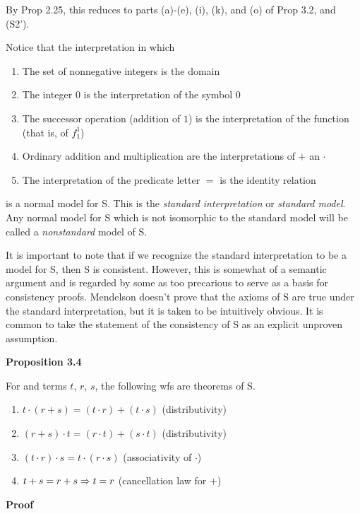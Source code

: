 By Prop 2.25, this reduces to parts (a)-(e), (i), (k), and (o) of Prop 3.2, and (S2').

Notice that the interpretation in which

\begin{enumerate} [label = \alph*.]
    \item The set of nonnegative integers is the domain
    \item The integer $0$ is the interpretation of the symbol $0$
    \item The successor operation (addition of $1$) is the interpretation of the function (that is, of $f_1^1$)
    \item Ordinary addition and multiplication are the interpretations of $+$ an $\cdot$
    \item The interpretation of the predicate letter $=$ is the identity relation
\end{enumerate}

is a normal model for S. This is the \textit{standard interpretation} or \textit{standard model}. Any normal model for S which is not isomorphic to the standard model will be called a \textit{nonstandard} model of S.

It is important to note that if we recognize the standard interpretation to be a model for S, then S is consistent. However, this is somewhat of a semantic argument and is regarded by some as too precarious to serve as a basis for consistency proofs. Mendelson doesn't prove that the axioms of S are true under the standard interpretation, but it is taken to be intuitively obvious. It is common to take the statement of the consistency of S as an explicit unproven assumption.

\textbf{Proposition 3.4}

For and terms $t$, $r$, $s$, the following wfs are theorems of S.

\begin{enumerate} [label = \alph*.]
    \item $t \cdot (r+s)=(t \cdot r) + (t \cdot s)$ (distributivity)
    \item $(r+s) \cdot t = (r\cdot t) + (s \cdot t)$ (distributivity)
    \item $(t \cdot r) \cdot s = t \cdot (r \cdot s)$ (associativity of $\cdot$)
    \item $t+s=r+s \Rightarrow t=r$ (cancellation law for $+$)
\end{enumerate}

\textbf{Proof}

